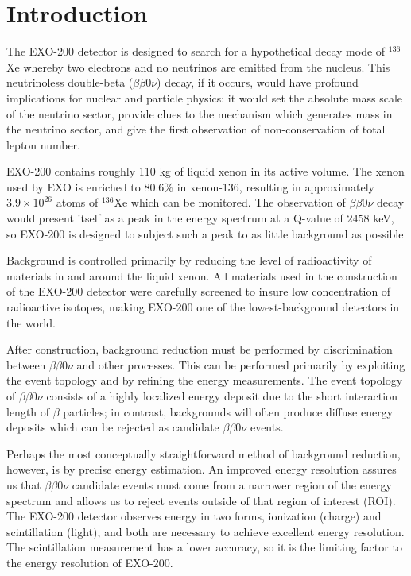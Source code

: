 \renewcommand{\thechapter}{1}
\chapter{Introduction}
\label{ch:Introduction}

The EXO-200 detector is designed to search for a hypothetical decay mode of $^{136}$Xe  whereby two electrons and no neutrinos are emitted from the nucleus.  This neutrinoless double-beta ($\beta\beta 0\nu$) decay, if it occurs, would have profound implications for nuclear and particle physics: it would set the absolute mass scale of the neutrino sector, provide clues to the mechanism which generates mass in the neutrino sector, and give the first observation of non-conservation of total lepton number.

EXO-200 contains roughly 110 kg of liquid xenon in its active volume.  The xenon used by EXO is enriched to $80.6\%$ in xenon-136, resulting in approximately $3.9 \times 10^{26}$ atoms of $^{136}$Xe which can be monitored.  The observation of $\beta\beta 0\nu$ decay would present itself as a peak in the energy spectrum at a Q-value of $2458$ keV, so EXO-200 is designed to subject such a peak to as little background as possible

Background is controlled primarily by reducing the level of radioactivity of materials in and around the liquid xenon.  All materials used in the construction of the EXO-200 detector were carefully screened to insure low concentration of radioactive isotopes, making EXO-200 one of the lowest-background detectors in the world.

After construction, background reduction must be performed by discrimination between $\beta\beta 0\nu$ and other processes.  This can be performed primarily by exploiting the event topology and by refining the energy measurements.  The event topology of $\beta\beta 0\nu$ consists of a highly localized energy deposit due to the short interaction length of $\beta$ particles; in contrast, backgrounds will often produce diffuse energy deposits which can be rejected as candidate $\beta\beta 0\nu$ events.

Perhaps the most conceptually straightforward method of background reduction, however, is by precise energy estimation.  An improved energy resolution assures us that $\beta\beta 0\nu$ candidate events must come from a narrower region of the energy spectrum and allows us to reject events outside of that region of interest (ROI).  The EXO-200 detector observes energy in two forms, ionization (charge) and scintillation (light), and both are necessary to achieve excellent energy resolution.  The scintillation measurement has a lower accuracy, so it is the limiting factor to the energy resolution of EXO-200.

